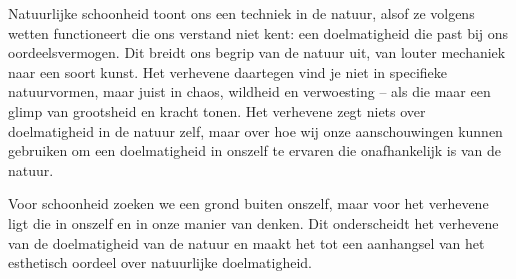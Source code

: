 \begin{mdframed}[leftmargin=0pt,rightmargin=0pt,backgroundcolor=blue!6,linecolor=white,innertopmargin=6pt,innerbottommargin=6pt]
Natuurlijke schoonheid toont ons een techniek in de natuur, alsof ze volgens wetten functioneert die ons verstand niet kent: een doelmatigheid die past bij ons oordeelsvermogen. Dit breidt ons begrip van de natuur uit, van louter mechaniek naar een soort kunst. Het verhevene daartegen vind je niet in specifieke natuurvormen, maar juist in chaos, wildheid en verwoesting – als die maar een glimp van grootsheid en kracht tonen. Het verhevene zegt niets over doelmatigheid in de natuur zelf, maar over hoe wij onze aanschouwingen kunnen gebruiken om een doelmatigheid in onszelf te ervaren die onafhankelijk is van de natuur.

Voor schoonheid zoeken we een grond buiten onszelf, maar voor het verhevene ligt die in onszelf en in onze manier van denken. Dit onderscheidt het verhevene van de doelmatigheid van de natuur en maakt het tot een aanhangsel van het esthetisch oordeel over natuurlijke doelmatigheid.


\end{mdframed}

